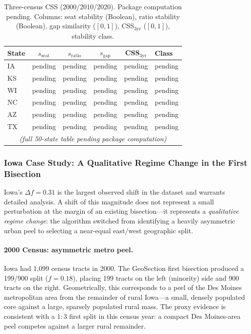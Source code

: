 \begin{table}[h]
\centering
\caption{Three-census CSS (2000/2010/2020). Package computation pending.
  Columns: seat stability (Boolean), ratio stability (Boolean), gap similarity ($[0,1]$),
  CSS$_{3\text{yr}}$ ($[0,1]$), stability class.}
\label{tab:three-census-css}
\small
\begin{tabular}{l c c c c l}
\toprule
State & $s_{\text{seat}}$ & $s_{\text{ratio}}$ & $s_{\text{gap}}$ & CSS$_{3\text{yr}}$ & Class \\
\midrule
IA  & pending & pending & pending & pending & pending \\
KS  & pending & pending & pending & pending & pending \\
WI  & pending & pending & pending & pending & pending \\
NC  & pending & pending & pending & pending & pending \\
AZ  & pending & pending & pending & pending & pending \\
TX  & pending & pending & pending & pending & pending \\
\multicolumn{6}{c}{\textit{(full 50-state table pending package computation)}} \\
\bottomrule
\end{tabular}
\end{table}

\subsubsection{Iowa Case Study: A Qualitative Regime Change in the First Bisection}
\label{sec:iowa-case-study}

Iowa's $\Delta f = 0.31$ is the largest observed shift in the dataset and warrants
detailed analysis.
A shift of this magnitude does not represent a small perturbation at the margin
of an existing bisection---it represents a \emph{qualitative regime change}: the
algorithm switched from identifying a heavily asymmetric urban peel to selecting
a near-equal east/west geographic split.

\paragraph{2000 Census: asymmetric metro peel.}
Iowa had 1{,}099 census tracts in 2000.
The GeoSection first bisection produced a 199/900 split ($f = 0.18$), placing
199 tracts on the left (minority) side and 900 tracts on the right.
Geometrically, this corresponds to a peel of the Des Moines metropolitan area
from the remainder of rural Iowa---a small, densely populated core against a
large, sparsely populated rural mass.
The proxy evidence is consistent with a $1:3$ first split in this census year:
a compact Des Moines-area peel competes against a larger rural remainder.

